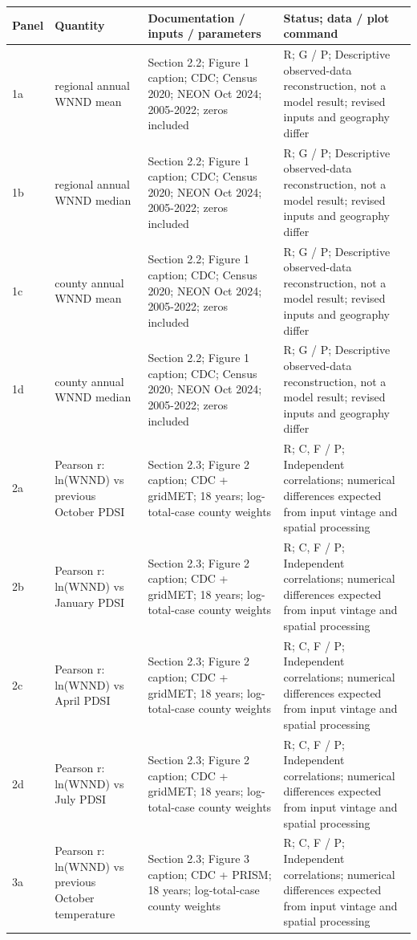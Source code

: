 \documentclass[11pt]{article}
\begin{document}
\begin{longtable}{p{}p{}p{}p{}}
\toprule Panel & Quantity & Documentation / inputs / parameters & Status; data / plot command\\\midrule\endhead
1a & regional annual WNND mean & Section 2.2; Figure 1 caption; CDC; Census 2020; NEON Oct 2024; 2005-2022; zeros included & R; G / P; Descriptive observed-data reconstruction, not a model result; revised inputs and geography differ \\
1b & regional annual WNND median & Section 2.2; Figure 1 caption; CDC; Census 2020; NEON Oct 2024; 2005-2022; zeros included & R; G / P; Descriptive observed-data reconstruction, not a model result; revised inputs and geography differ \\
1c & county annual WNND mean & Section 2.2; Figure 1 caption; CDC; Census 2020; NEON Oct 2024; 2005-2022; zeros included & R; G / P; Descriptive observed-data reconstruction, not a model result; revised inputs and geography differ \\
1d & county annual WNND median & Section 2.2; Figure 1 caption; CDC; Census 2020; NEON Oct 2024; 2005-2022; zeros included & R; G / P; Descriptive observed-data reconstruction, not a model result; revised inputs and geography differ \\
2a & Pearson r: ln(WNND) vs previous October PDSI & Section 2.3; Figure 2 caption; CDC + gridMET; 18 years; log-total-case county weights & R; C, F / P; Independent correlations; numerical differences expected from input vintage and spatial processing \\
2b & Pearson r: ln(WNND) vs January PDSI & Section 2.3; Figure 2 caption; CDC + gridMET; 18 years; log-total-case county weights & R; C, F / P; Independent correlations; numerical differences expected from input vintage and spatial processing \\
2c & Pearson r: ln(WNND) vs April PDSI & Section 2.3; Figure 2 caption; CDC + gridMET; 18 years; log-total-case county weights & R; C, F / P; Independent correlations; numerical differences expected from input vintage and spatial processing \\
2d & Pearson r: ln(WNND) vs July PDSI & Section 2.3; Figure 2 caption; CDC + gridMET; 18 years; log-total-case county weights & R; C, F / P; Independent correlations; numerical differences expected from input vintage and spatial processing \\
3a & Pearson r: ln(WNND) vs previous October temperature & Section 2.3; Figure 3 caption; CDC + PRISM; 18 years; log-total-case county weights & R; C, F / P; Independent correlations; numerical differences expected from input vintage and spatial processing \\

\end{longtable}
\end{document}
